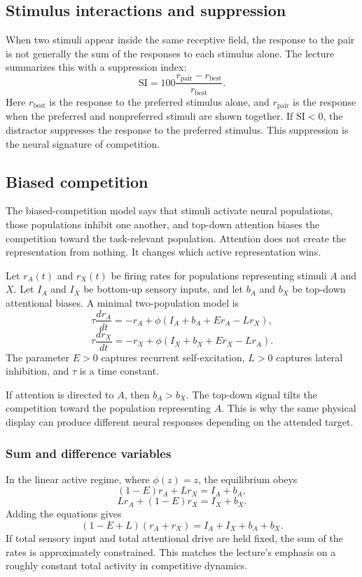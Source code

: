 \subsection{Stimulus interactions and suppression}

When two stimuli appear inside the same receptive field, the response to the pair is not generally the sum of the responses to each stimulus alone. The lecture summarizes this with a suppression index:
\[
\mathrm{SI}
=
100\frac{r_{\mathrm{pair}}-r_{\mathrm{best}}}{r_{\mathrm{best}}}.
\]
Here \(r_{\mathrm{best}}\) is the response to the preferred stimulus alone, and \(r_{\mathrm{pair}}\) is the response when the preferred and nonpreferred stimuli are shown together. If \(\mathrm{SI}<0\), the distractor suppresses the response to the preferred stimulus. This suppression is the neural signature of competition.

\subsection{Biased competition}

The biased-competition model says that stimuli activate neural populations, those populations inhibit one another, and top-down attention biases the competition toward the task-relevant population. Attention does not create the representation from nothing. It changes which active representation wins.

Let \(r_A(t)\) and \(r_X(t)\) be firing rates for populations representing stimuli \(A\) and \(X\). Let \(I_A\) and \(I_X\) be bottom-up sensory inputs, and let \(b_A\) and \(b_X\) be top-down attentional biases. A minimal two-population model is
\[
\tau \frac{d r_A}{dt}
=
-r_A
+
\phi\!\left(I_A+b_A+Er_A-Lr_X\right),
\]
\[
\tau \frac{d r_X}{dt}
=
-r_X
+
\phi\!\left(I_X+b_X+Er_X-Lr_A\right).
\]
The parameter \(E>0\) captures recurrent self-excitation, \(L>0\) captures lateral inhibition, and \(\tau\) is a time constant.

If attention is directed to \(A\), then \(b_A>b_X\). The top-down signal tilts the competition toward the population representing \(A\). This is why the same physical display can produce different neural responses depending on the attended target.

\subsubsection{Sum and difference variables}

In the linear active regime, where \(\phi(z)=z\), the equilibrium obeys
\[
(1-E)r_A + Lr_X = I_A+b_A,
\]
\[
Lr_A + (1-E)r_X = I_X+b_X.
\]
Adding the equations gives
\[
(1-E+L)(r_A+r_X)
=
I_A+I_X+b_A+b_X.
\]
If total sensory input and total attentional drive are held fixed, the sum of the rates is approximately constrained. This matches the lecture's emphasis on a roughly constant total activity in competitive dynamics.


